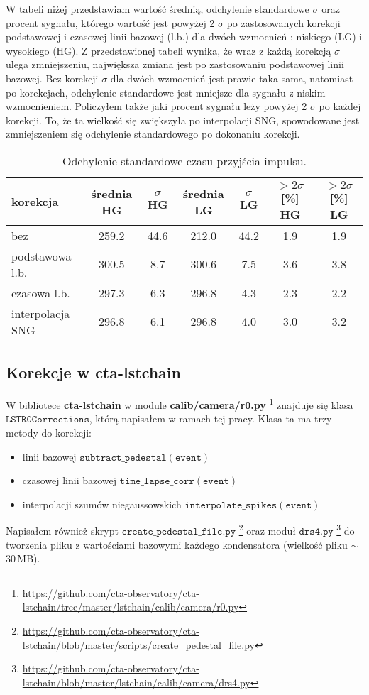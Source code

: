 \documentclass[a4paper,11pt,twoside]{article}
\begin{document}
\newpage
W tabeli niżej przedstawiam wartość średnią, odchylenie standardowe $\sigma$ oraz procent sygnału, którego wartość jest powyżej 2 $\sigma$ po zastosowanych korekcji podstawowej i czasowej linii bazowej (l.b.) dla dwóch wzmocnień : niskiego (LG) i wysokiego (HG). Z przedstawionej tabeli wynika, że wraz z każdą korekcją $\sigma$ ulega zmniejszeniu, największa zmiana jest po zastosowaniu podstawowej linii bazowej. Bez korekcji $\sigma$ dla dwóch wzmocnień jest prawie taka sama, natomiast po korekcjach, odchylenie standardowe jest mniejsze dla sygnału z niskim wzmocnieniem. Policzyłem także jaki procent sygnału leży powyżej 2 $\sigma$ po każdej korekcji.    
To, że ta wielkość się zwiększyła po interpolacji SNG, spowodowane jest zmniejszeniem się odchylenie standardowego po dokonaniu korekcji. 
\begin{table}[H]
\caption{Odchylenie standardowe czasu przyjścia impulsu.}
\begin{tabular}{|l|c|c|c|c|c|c|}
\hline
korekcja & średnia HG  & $\sigma$ HG  & średnia LG & $\sigma$ LG & $> 2 \sigma$ [\%] HG & $> 2 \sigma$ [\%] LG \\ \hline
bez  & 259.2  & 44.6  & 212.0 & 44.2 & 1.9 & 1.9  \\ \hline
podstawowa l.b. & 300.5  & 8.7  & 300.6 & 7.5 & 3.6 & 3.8    \\  \hline
czasowa l.b. & 297.3  & 6.3  & 296.8 & 4.3 & 2.3 & 2.2  \\  \hline
interpolacja SNG & 296.8  & 6.1 &  296.8 & 4.0 & 3.0 & 3.2  \\  \hline
\end{tabular}
\label{tab:std}
\end{table}
\subsection{Korekcje w cta-lstchain}
W bibliotece {\bf{cta-lstchain}} w module {\bf{calib/camera/r0.py}} \footnote{\url{https://github.com/cta-observatory/cta-lstchain/tree/master/lstchain/calib/camera/r0.py}} znajduje się klasa $\mathtt{LSTR0Corrections}$, którą napisałem w ramach tej pracy. Klasa ta ma trzy metody do korekcji:
\begin{itemize}
\item linii bazowej $\mathtt{subtract\_pedestal(event)}$
\item czasowej linii bazowej $\mathtt{time\_lapse\_corr(event)}$
\item interpolacji szumów niegaussowskich $\mathtt{interpolate\_spikes(event)}$
\end{itemize}
Napisałem również skrypt $\mathtt{create\_pedestal\_file.py}$ \footnote{\url{https://github.com/cta-observatory/cta-lstchain/blob/master/scripts/create_pedestal_file.py}} oraz moduł $\mathtt{drs4.py}$ \footnote{\url{https://github.com/cta-observatory/cta-lstchain/blob/master/lstchain/calib/camera/drs4.py}} do tworzenia pliku z wartościami bazowymi każdego kondensatora (wielkość pliku $\sim$30\,MB). 
\newpage
\end{document}
